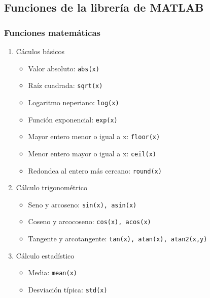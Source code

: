 \subsection{Funciones de la librería de MATLAB}
\begin{frame}[label=func_builtin,shrink=10]
 \frametitle{Funciones matemáticas}
 \begin{enumerate}
  \item Cáculos básicos
   \begin{itemize}
    \item Valor absoluto: \texttt{abs(x)}
    \item Raíz cuadrada: \alert{\texttt{sqrt(x)}}
    \item Logaritmo neperiano: \texttt{log(x)}
    \item Función exponencial: \alert{\texttt{exp(x)}}
    \item Mayor entero menor o igual a x: \texttt{floor(x)}
    \item Menor entero mayor o igual a x: \texttt{ceil(x)}
    \item Redondea al entero más cercano: \texttt{round(x)}
   \end{itemize}
  \item Cálculo trigonométrico
   \begin{itemize}
    \item Seno y arcoseno: \texttt{\alert{sin(x)}, asin(x)}
    \item Coseno y arcocoseno: \texttt{\alert{cos(x)}, acos(x)}
    \item Tangente y arcotangente: \texttt{\alert{tan(x)}, atan(x),
      \alert{atan2(x,y)}}
 \end{itemize}
  \item Cálculo estadístico
   \begin{itemize}
    \item Media: \alert{\texttt{mean(x)}}
    \item Desviación típica: \alert{\texttt{std(x)}}
 \end{itemize}
\end{enumerate}
\end{frame}
